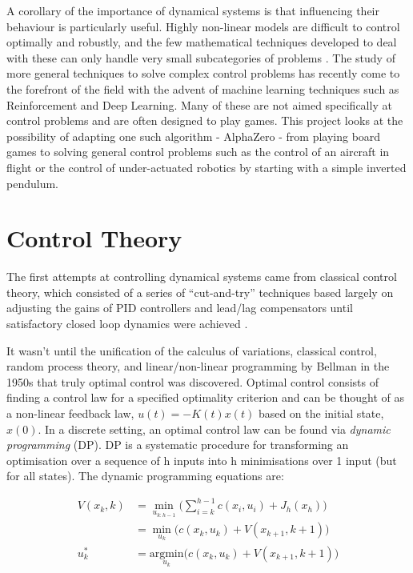 \documentclass[../main.tex]{subfiles}
\begin{document}
A corollary of the importance of dynamical systems is that influencing their behaviour is particularly useful. Highly non-linear models are difficult to control optimally and robustly, and the few mathematical techniques developed to deal with these can only handle very small subcategories of problems \cite{4f2, 4f3}. The study of more general techniques to solve complex control problems has recently come to the forefront of the field with the advent of machine learning techniques such as Reinforcement and Deep Learning. Many of these are not aimed specifically at control problems and are often designed to play games. This project looks at the possibility of adapting one such algorithm - AlphaZero - from playing board games to solving general control problems such as the control of an aircraft in flight or the control of under-actuated robotics by starting with a simple inverted pendulum.

\section{Control Theory}
The first attempts at controlling dynamical systems came from classical control theory, which consisted of a series of ``cut-and-try'' techniques based largely on adjusting the gains of PID controllers and lead/lag compensators until satisfactory closed loop dynamics were achieved \cite{History}.

It wasn't until the unification of the calculus of variations, classical control, random process theory, and linear/non-linear programming by Bellman in the 1950s \cite{History} that truly optimal control was discovered. Optimal control consists of finding a control law for a specified optimality criterion and can be thought of as a non-linear feedback law, $u(t) = -K(t)x(t)$ based on the initial state, $x(0)$. In a discrete setting, an optimal control law can be found via \textit{dynamic programming} (DP). DP is a systematic procedure for transforming an optimisation over a sequence of h inputs into h minimisations over 1 input (but for all states). The dynamic programming equations are:

\begin{align}
    \label{equ:detval} 
    V(x_k, k) & = \underset{u_{k:h-1}}{\min} \bigg( \sum_{i=k}^{h-1} c(x_i, u_i) + J_h(x_h) \bigg) \\ 
    & = \underset{u_k}{\min} \Big( c(x_k, u_k) + V(x_{k+1}, k+1) \Big) \\
    u^{*}_k & = \underset{u_k}{\text{argmin}} \Big( c(x_k, u_k) + V(x_{k+1}, k+1) \Big) \\
\end{align}
\end{document}
